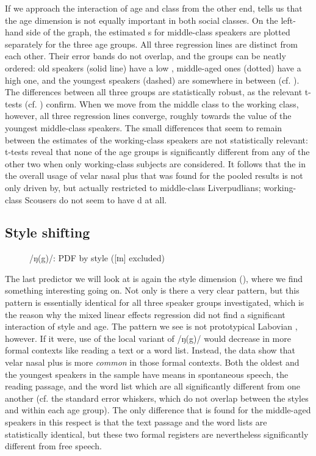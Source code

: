 If we approach the interaction of age and class from the other end,  tells us that the age dimension is not equally important in both social classes.
On the left-hand side of the graph, the estimated s for middle-class speakers are plotted separately for the three age groups.
All three regression lines are distinct from each other.
Their error bands do not overlap, and the groups can be neatly ordered: old speakers (solid line) have a low , middle-aged ones (dotted) have a high one, and the youngest speakers (dashed) are somewhere in between (cf. ).
The differences between all three groups are statistically robust, as the relevant t-tests (cf. ) confirm.
When we move from the middle class to the working class, however, all three regression lines converge, roughly towards the value of the youngest middle-class speakers.
The small differences that seem to remain between the estimates of the working-class speakers are not statistically relevant: t-tests reveal that none of the age groups is significantly different from any of the other two when only working-class subjects are considered.
It follows that the  in the overall usage of velar nasal plus that was found for the pooled results is not only driven by, but actually restricted to middle-class Liverpudlians; working-class Scousers do not seem to have d at all.

\subsection{Style shifting}
\label{sec.prod.res.con.ng.shifting}

\begin{figure}[h]
	\centering
		\resizebox{0.5\linewidth}{!}{} 
	\caption{/ŋ(g)/: PDF by style ([ɪn] excluded)}
	\label{fig.line.ng.tot}
\end{figure}

The last predictor we will look at is again the style dimension (), where we find something interesting going on.
Not only is there a very clear pattern, but this pattern is essentially identical for all three speaker groups investigated, which is the reason why the mixed linear effects regression did not find a significant interaction of style and age.
The pattern we see is not prototypical Labovian , however.
If it were, use of the local variant of /ŋ(g)/ would decrease in more formal contexts like reading a text or a word list.
Instead, the data show that velar nasal plus is more \emph{common} in those formal contexts.
Both the oldest and the youngest speakers in the sample have means in spontaneous speech, the reading passage, and the word list which are all significantly different from one another (cf. the standard error whiskers, which do not overlap between the styles and within each age group).
The only difference that is found for the middle-aged speakers in this respect is that the text passage and the word lists are statistically identical, but these two formal registers are nevertheless significantly different from free speech.

